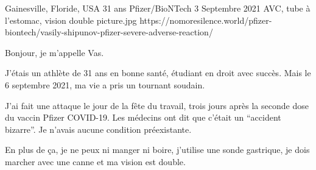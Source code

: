 {Gainesville, Floride, USA}
{31 ans}
{Pfizer/BioNTech}
{3 Septembre 2021}
{AVC, tube à l'estomac, vision double}
{picture.jpg}
{https://nomoresilence.world/pfizer-biontech/vasily-shipunov-pfizer-severe-adverse-reaction/}
{

Bonjour, je m'appelle Vas.

J'étais un athlète de 31 ans en bonne santé, étudiant en droit avec succès. Mais
le 6 septembre 2021, ma vie a pris un tournant soudain.

J'ai fait une attaque le jour de la fête du travail, trois jours après la
seconde dose du vaccin Pfizer COVID-19. Les médecins ont dit que c'était un
“accident bizarre”. Je n'avais aucune condition préexistante.

En plus de ça, je ne peux ni manger ni boire, j'utilise une sonde gastrique, je
dois marcher avec une canne et ma vision est double.

}
